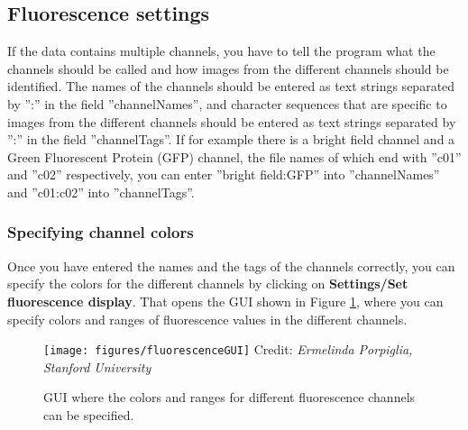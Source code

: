 \documentclass[a4paper, oneside, onecolumn, 11pt]{article}
\newcommand{\menu}[1]{\textbf{#1}}
\newcommand{\setting}[1]{''#1''}
\newcommand{\credit}[1]{\raggedleft \scriptsize Credit:\emph{ #1}}
\begin{document}
\subsection{Fluorescence settings}
\label{sec:settings-fluorescence}
If the data contains multiple channels, you have to tell the program what the channels should be called and how images from the different channels should be identified. The names of the channels should be entered as text strings separated by \setting{:} in the field \setting{channelNames}, and character sequences that are specific to images from the different channels should be entered as text strings separated by \setting{:} in the field \setting{channelTags}. If for example there is a bright field channel and a Green Fluorescent Protein (GFP) channel, the file names of which end with \setting{c01} and \setting{c02} respectively, you can enter \setting{bright field:GFP} into \setting{channelNames} and \setting{c01:c02} into \setting{channelTags}.

\subsubsection{Specifying channel colors}
Once you have entered the names and the tags of the channels correctly, you can specify the colors for the different channels by clicking on \menu{Settings/\allowbreak Set fluorescence display}. That opens the GUI shown in Figure \ref{fig:fluorescence-GUI}, where you can specify colors and ranges of fluorescence values in the different channels.

\begin{figure}[!htb]
\begin{center}
\texttt{[image: figures/fluorescenceGUI]}
\credit{Ermelinda Porpiglia, Stanford University}
\caption{GUI where the colors and ranges for different fluorescence channels can be specified.}
\label{fig:fluorescence-GUI}
\end{center}
\end{figure}
\end{document}
